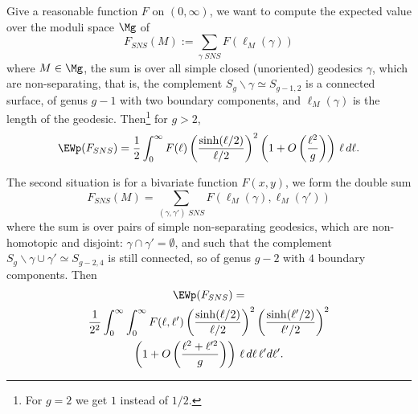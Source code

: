 \documentclass[12pt]{amsart}
\begin{document}
Give a reasonable function $F$ on $(0,\infty)$, we want to compute the expected value over the moduli space $\Mg$ of 
\[
F_{SNS}(M):=\sum_{\gamma\; SNS} F(\ell_M(\gamma))
\]  
where $M\in \Mg$, the sum is over all simple closed (unoriented) geodesics $\gamma$, which are non-separating, that is, the complement  $S_g\backslash \gamma\simeq S_{g-1,2}$ is a connected surface, of genus $g-1$ with two boundary components, and $\ell_M(\gamma)$ is the length of the geodesic. Then\footnote{For $g=2$ we get $1$ instead of $1/2$.} for $g>2$, 
\begin{equation}\label{eq:sum SNS}
\EWp(F_{SNS}) = \frac 12 \int_0^\infty F(\ell) \left( \frac{\sinh (\ell/2)}{\ell/2}\right)^2\left(1+O\left( \frac {\ell^2 }{g} \right) \right)  \,\ell \,d\ell .
\end{equation}


 
 
The second situation is for a bivariate function $F(x,y)$, we form the double sum
\[
F_{SNS}(M) = \sum_{(\gamma,\gamma') \; SNS} F\left( \ell_M(\gamma), \ell_M(\gamma') \right)
\]
where the sum is over pairs of simple non-separating geodesics, which are non-homotopic and disjoint: $\gamma\cap \gamma'=\emptyset$, and such that the complement $S_g\backslash \gamma\cup \gamma'\simeq S_{g-2,4}$ is still connected, so of genus $g-2$ with $4$ boundary components. Then %
\begin{multline}\label{eq:double sum SNS}
\EWp(F_{SNS}) =
\\
 \frac 1{2^2} \int_0^\infty\int_0^\infty  F(\ell,\ell') \left( \frac{\sinh (\ell/2)}{\ell/2}\right)^2 \left( \frac{\sinh (\ell'/2)}{\ell'/2}\right)^2 
\\
\left(1+O\left( \frac { \ell^2 +  \ell'^2}{g} \right) \right) \,\ell \,d\ell\,\ell'd\ell'  .
\end{multline}




\end{document}

